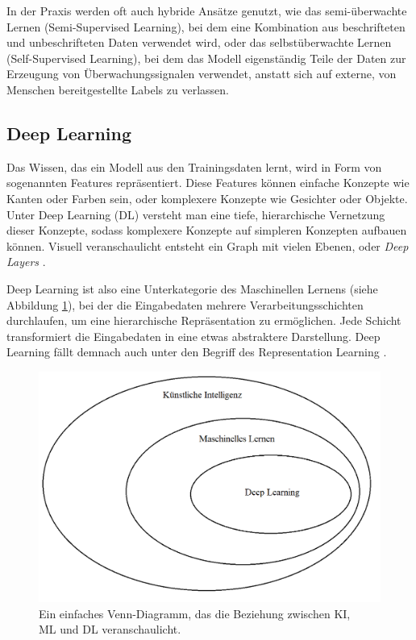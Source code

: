 In der Praxis werden oft auch hybride Ansätze genutzt, wie das semi-überwachte Lernen (Semi-Supervised Learning), bei dem eine Kombination aus beschrifteten und unbeschrifteten Daten verwendet wird, oder das selbstüberwachte Lernen (Self-Supervised Learning), bei dem das Modell eigenständig Teile der Daten zur Erzeugung von Überwachungssignalen verwendet, anstatt sich auf externe, von Menschen bereitgestellte Labels zu verlassen.

\subsection{Deep Learning} \label{sec:deep-learning}

Das Wissen, das ein Modell aus den Trainingsdaten lernt, wird in Form von sogenannten Features repräsentiert. Diese Features können einfache Konzepte wie Kanten oder Farben sein, oder komplexere Konzepte wie Gesichter oder Objekte. Unter Deep Learning (DL) versteht man eine tiefe, hierarchische Vernetzung dieser Konzepte, sodass komplexere Konzepte auf simpleren Konzepten aufbauen können. Visuell veranschaulicht entsteht ein Graph mit vielen Ebenen, oder \textit{Deep Layers} \parencite{Goodfellow2016deeplearning}.

Deep Learning ist also eine Unterkategorie des Maschinellen Lernens (siehe Abbildung \ref{fig:ai-venn}), bei der die Eingabedaten mehrere Verarbeitungsschichten durchlaufen, um eine hierarchische Repräsentation zu ermöglichen. Jede Schicht transformiert die Eingabedaten in eine etwas abstraktere Darstellung. Deep Learning fällt demnach auch unter den Begriff des Representation Learning \parencite{Zhou2021machinelearning}.

\begin{figure}[t]
	\centering
	\includegraphics[width=12cm]{figure_ai_venn-diagram.png}
	\caption{Ein einfaches Venn-Diagramm, das die Beziehung zwischen KI,\\
	ML und DL veranschaulicht.}
	\label{fig:ai-venn}
\end{figure}

